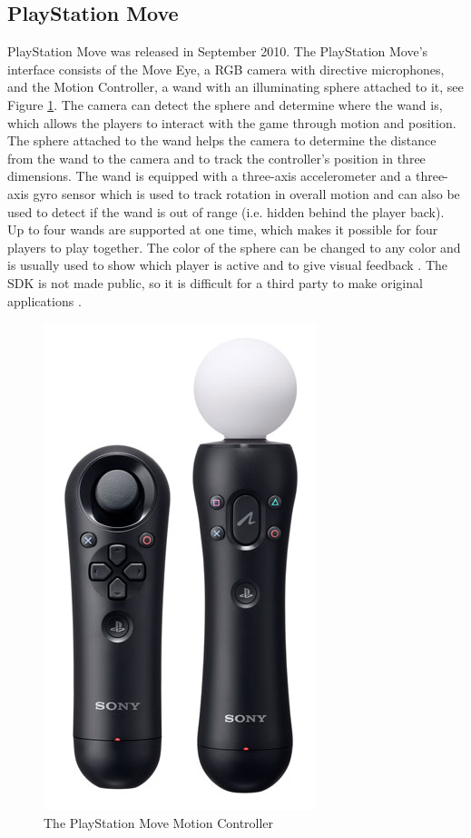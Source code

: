 \subsection{PlayStation Move}
PlayStation Move was released in September 2010. The PlayStation Move’s interface consists of the Move Eye, a RGB camera with directive microphones, and the Motion Controller, a wand with an illuminating sphere attached to it, see Figure \ref{fig:PSMove}. The camera can detect the sphere and determine where the wand is, which allows the players to interact with the game through motion and position. The sphere attached to the wand helps the camera to determine the distance from the wand to the camera and to track the controller's position in three dimensions. The wand is equipped with a three-axis accelerometer and a three-axis gyro sensor which is used to track rotation in overall motion and can also be used to detect if the wand is out of range (i.e. hidden behind the player back). \cite{comparison} Up to four wands are supported at one time, which makes it possible for four players to play together. The color of the sphere can be changed to any color and is usually used to show which player is active and to give visual feedback \cite{ppmove}. The SDK is not made public, so it is difficult for a third party to make original applications \cite{comparison}. 
\begin{figure}[h!]
\begin{center}
\includegraphics[scale=0.3]{PSmove}
\caption[PlayStation Move Motion Controller]{The PlayStation Move Motion Controller}
\label{fig:PSMove}
\end{center}
\end{figure}

